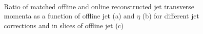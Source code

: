  \begin{figure}[hbtp]
  \centering
  \hfill
   \\
  \caption[Jet response as a function of jet \pt and $\eta$]{Ratio of matched offline and online reconstructed jet
transverse momenta as a function of offline jet \pt (a) and $\eta$ (b) for different jet corrections and in slices of
offline jet \pt (c)}
\label{fig:top_hlt_jet_response} 
\end{figure}

